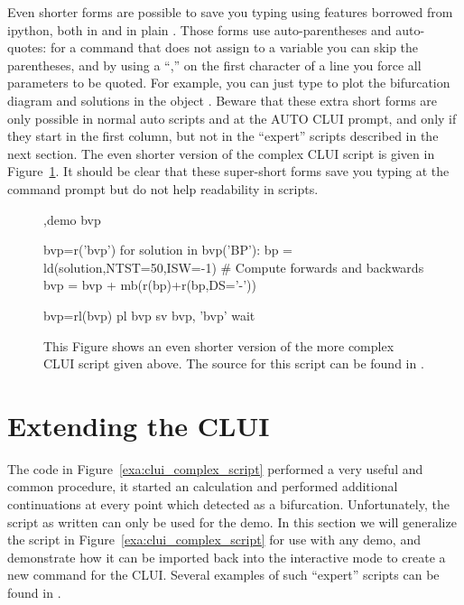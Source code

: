 \documentclass[12pt]{report}
\begin{document}
 Even shorter forms are possible to save you typing using features
 borrowed from ipython, both in  and in plain
 . Those forms use auto-parentheses and auto-quotes:
 for a command that does not assign to a variable you can skip the
 parentheses, and by using a ``,'' on the first character of a line
 you force all parameters to be quoted. For example, you can just
 type  to plot the bifurcation diagram and solutions
 in the object .
 Beware that these extra short forms are only possible in
 normal auto scripts and at the AUTO CLUI prompt, and only if they
 start in the first column, but not in the
 ``expert'' scripts described in the next section.
 The even shorter version of the complex \AUTO
 CLUI script is given in Figure~\ref{exa:clui_complex_fifth}.
 It should be clear that these super-short forms save you typing
 at the command prompt but do not help readability in scripts.
 \begin{figure}[htbp]
 {\small \begin{center} \begin{boxedverbatim}
 ,demo bvp

 bvp=r('bvp')
 for solution in bvp('BP'):
     bp = ld(solution,NTST=50,ISW=-1)
     # Compute forwards and backwards
     bvp = bvp + mb(r(bp)+r(bp,DS='-'))

 bvp=rl(bvp)
 pl bvp
 sv bvp, 'bvp'
 wait
 \end{boxedverbatim}
 \end{center} 
 }
 \caption[Another complex example of a \AUTO CLUI script.]
 {This Figure shows an even shorter version of the more complex \AUTO CLUI
   script given above.
 The source for this script can be found in .
 }
 \label{exa:clui_complex_fifth}
 \end{figure}



 \section{ Extending the \AUTO CLUI } \label{sec:clui_extending}

 The code in Figure~\ref{exa:clui_complex_script}
 performed a very useful and common procedure, it started an \AUTO
 calculation and performed additional continuations
 at every point which \AUTO detected as a bifurcation.
 Unfortunately, the script as written can only be used
 for the  demo.  In this section we will 
 generalize the script in Figure~\ref{exa:clui_complex_script}
 for use with any demo, and demonstrate how it
 can be imported back into the interactive
 mode to create a new command
 for the \AUTO CLUI.  Several examples of such
 ``expert'' scripts can be found in .
\end{document}
